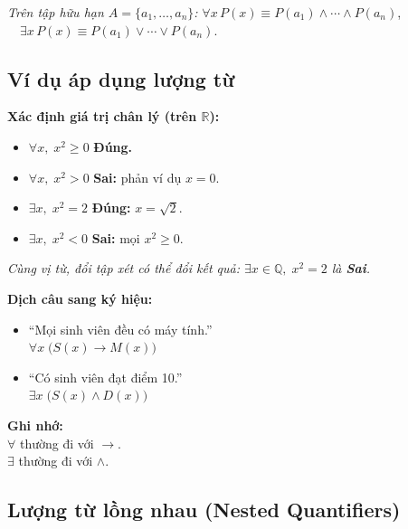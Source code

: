 \documentclass[12pt,a4paper]{article}
\begin{document}
\textit{Trên tập hữu hạn $A = \{a_1, \dots, a_n\}$:} $\forall x\, P(x) \equiv P(a_1) \land \cdots \land P(a_n)$, $\quad \exists x\, P(x) \equiv P(a_1) \lor \cdots \lor P(a_n)$.

\subsection{Ví dụ áp dụng lượng từ}

\noindent
\begin{minipage}[t]{0.48\textwidth}
\textbf{Xác định giá trị chân lý (trên $\mathbb{R}$):}
\begin{itemize}
  \item $\forall x,\; x^2 \ge 0$ \quad \textcolor{AccentGreen}{\textbf{Đúng.}}
  \item $\forall x,\; x^2 > 0$ \quad \textcolor{AccentRed}{\textbf{Sai:}} phản ví dụ $x = 0$.
  \item $\exists x,\; x^2 = 2$ \quad \textcolor{AccentGreen}{\textbf{Đúng:}} $x = \sqrt{2}$.
  \item $\exists x,\; x^2 < 0$ \quad \textcolor{AccentRed}{\textbf{Sai:}} mọi $x^2 \ge 0$.
\end{itemize}
\textit{Cùng vị từ, đổi tập xét có thể đổi kết quả: $\exists x \in \mathbb{Q},\; x^2 = 2$ là \textcolor{AccentRed}{\textbf{Sai}}.}
\end{minipage}
\hfill
\begin{minipage}[t]{0.48\textwidth}
\textbf{Dịch câu sang ký hiệu:}
\begin{itemize}
  \item ``Mọi sinh viên đều có máy tính.''\\
  $\forall x\;\big(S(x) \to M(x)\big)$
  \item ``Có sinh viên đạt điểm 10.''\\
  $\exists x\;\big(S(x) \land D(x)\big)$
\end{itemize}
\vspace{4pt}
\textbf{\textcolor{AccentRed}{Ghi nhớ:}}\\
$\forall$ thường đi với $\to$.\\
$\exists$ thường đi với $\land$.
\end{minipage}

\subsection{Lượng từ lồng nhau (Nested Quantifiers)}
\end{document}
